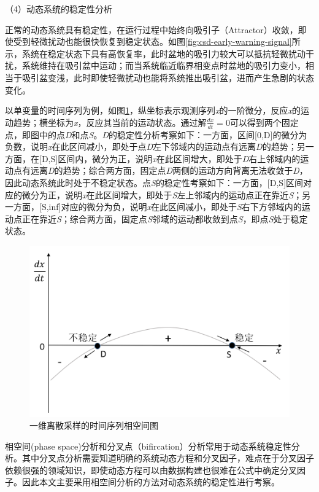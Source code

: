 （4）动态系统的稳定性分析

正常的动态系统具有稳定性，在运行过程中始终向吸引子（Attractor）收敛，即使受到轻微扰动也能很快恢复到稳定状态。如图\ref{fig:csd-early-warning-signal}所示，系统在稳定状态下具有高恢复率，此时盆地的吸引力较大可以抵抗轻微扰动干扰，系统维持在吸引盆中运动；而当系统临近临界相变点时盆地的吸引力变小，相当于吸引盆变浅，此时即使轻微扰动也能将系统推出吸引盆，进而产生急剧的状态变化。

以单变量的时间序列为例，如图\ref{fig:csd-phase-plot-single-variable}，纵坐标表示观测序列\emph{x}的一阶微分，反应\emph{x}的运动趋势；横坐标为\emph{x}，反应其当前的运动状态。通过解$\frac{dx}{dt}=0$可以得到两个固定点，即图中的点\emph{D}和点\emph{S}。\emph{D}的稳定性分析考察如下：一方面，区间[0,D]的微分为负数，说明\emph{x}在此区间减小，即处于点\emph{D}左下邻域内的运动点有远离\emph{D}的趋势；另一方面，在[D,S]区间内，微分为正，说明\emph{x}在此区间增大，即处于\emph{D}右上邻域内的运动点有远离\emph{D}的趋势；综合两方面，固定点\emph{D}两侧的运动方向背离无法收敛于\emph{D}，因此动态系统此时处于不稳定状态。点\emph{S}的稳定性考察如下：一方面，[D,S]区间对应的微分为正，说明\emph{x}在此区间增大，即处于\emph{S}左上邻域内的运动点正在靠近\emph{S}；另一方面，[S,inf]对应的微分为负，说明\emph{x}在此区间减小，即处于\emph{S}右下方邻域内的运动点正在靠近\emph{S}；综合两方面，固定点\emph{S}邻域的运动都收敛到点\emph{S}，即点\emph{S}处于稳定状态。
\begin{figure}[H]
\centering
\includegraphics[scale=0.5]{figures/csd-phase-plot-single-variable.png}
\caption{一维离散采样的时间序列相空间图}
\label{fig:csd-phase-plot-single-variable}
\end{figure}
相空间(phase space)分析和分叉点（bifircation）分析常用于动态系统稳定性分析。其中分叉点分析需要知道明确的系统动态方程和分叉因子，难点在于分叉因子依赖很强的领域知识，即使动态方程可以由数据构建也很难在公式中确定分叉因子。因此本文主要采用相空间分析的方法对动态系统的稳定性进行考察。

